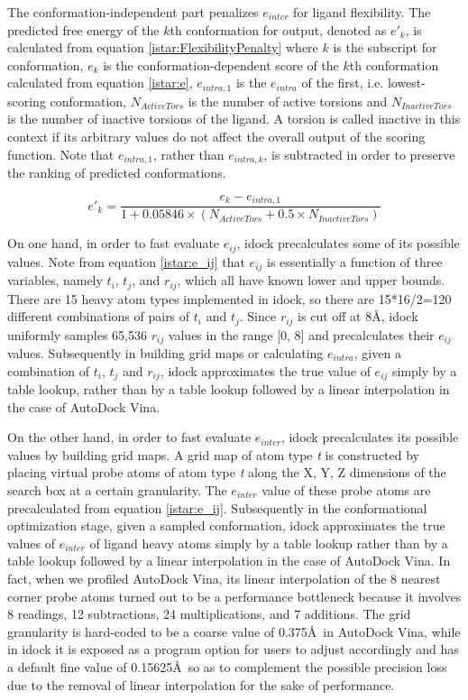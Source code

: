The conformation-independent part penalizes $e_{inter}$ for ligand flexibility. The predicted free energy of the $k$th conformation for output, denoted as $e'_k$, is calculated from equation \eqref{istar:FlexibilityPenalty} where $k$ is the subscript for conformation, $e_k$ is the conformation-dependent score of the $k$th conformation calculated from equation \eqref{istar:e}, $e_{intra,1}$ is the $e_{intra}$ of the first, i.e. lowest-scoring conformation, $N_{ActiveTors}$ is the number of active torsions and $N_{InactiveTors}$ is the number of inactive torsions of the ligand. A torsion is called inactive in this context if its arbitrary values do not affect the overall output of the scoring function. Note that $e_{intra,1}$, rather than $e_{intra,k}$, is subtracted in order to preserve the ranking of predicted conformations.

\begin{equation}
\label{istar:FlexibilityPenalty}
e'_k = \frac{e_k - e_{intra,1}}{1 + 0.05846 \times (N_{ActiveTors} + 0.5 \times N_{InactiveTors})}
\end{equation}

On one hand, in order to fast evaluate $e_{ij}$, idock precalculates some of its possible values. Note from equation \eqref{istar:e_ij} that $e_{ij}$ is essentially a function of three variables, namely $t_i$, $t_j$, and $r_{ij}$, which all have known lower and upper bounds. There are 15 heavy atom types implemented in idock, so there are 15*16/2=120 different combinations of pairs of $t_i$ and $t_j$. Since $r_{ij}$ is cut off at 8\AA, idock uniformly samples 65,536 $r_{ij}$ values in the range [0, 8] and precalculates their $e_{ij}$ values. Subsequently in building grid maps or calculating $e_{intra}$, given a combination of $t_i$, $t_j$ and $r_{ij}$, idock approximates the true value of $e_{ij}$ simply by a table lookup, rather than by a table lookup followed by a linear interpolation in the case of AutoDock Vina.

On the other hand, in order to fast evaluate $e_{inter}$, idock precalculates its possible values by building grid maps. A grid map of atom type \textit{t} is constructed by placing virtual probe atoms of atom type \textit{t} along the X, Y, Z dimensions of the search box at a certain granularity. The $e_{inter}$ value of these probe atoms are precalculated from equation \eqref{istar:e_ij}. Subsequently in the conformational optimization stage, given a sampled conformation, idock approximates the true values of $e_{inter}$ of ligand heavy atoms simply by a table lookup rather than by a table lookup followed by a linear interpolation in the case of AutoDock Vina. In fact, when we profiled AutoDock Vina, its linear interpolation of the 8 nearest corner probe atoms turned out to be a performance bottleneck because it involves 8 readings, 12 subtractions, 24 multiplications, and 7 additions. The grid granularity is hard-coded to be a coarse value of 0.375\AA\ in AutoDock Vina, while in idock it is exposed as a program option for users to adjust accordingly and has a default fine value of 0.15625\AA\ so as to complement the possible precision loss due to the removal of linear interpolation for the sake of performance.


